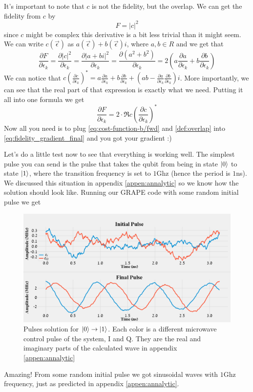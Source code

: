 It's important to note that $c$ is not the fidelity, but the overlap. We can get the fidelity from $c$ by
\[
F = |c|^2
\]
since $c$ might be complex this derivative is a bit less trivial than it might seem. We can write $c (\vec{\epsilon})$ as $a (\vec{\epsilon}) + b (\vec{\epsilon})i$, where $a, b \in R$ and we get that 
\[
\frac{\partial F}{\partial \epsilon_k} = \frac{\partial |c|^2}{\partial \epsilon_k} = \frac{\partial |a+bi|^2}{\partial \epsilon_k} = \frac{\partial (a^2 + b^2)}{\partial \epsilon_k} = 2 (a\frac{\partial a}{\partial \epsilon_k} + b\frac{\partial b}{\partial \epsilon_k})
\]
We can notice that $c (\frac{\partial c}{\partial \epsilon_k})^* = a\frac{\partial a}{\partial \epsilon_k} + b\frac{\partial b}{\partial \epsilon_k} + (ab - \frac{\partial a}{\partial \epsilon_k}\frac{\partial b}{\partial \epsilon_k})i$. More importantly, we can see that the real part of that expression is exactly what we need. Putting it all into one formula we get
\begin{equation} \label{eq:fidelity_gradient_final}
    \frac{\partial F}{\partial \epsilon_k} = 2\cdot \Re{c (\frac{\partial c}{\partial \epsilon_k})^*}
\end{equation}
Now all you need is to plug \ref{eq:cost-function-b/fwd} and \ref{def:overlap} into \ref{eq:fidelity_gradient_final} and you got your gradient :)

Let's do a little test now to see that everything is working well. The simplest pulse you can send is the pulse that takes the qubit from being in state $\ket{0}$ to state $\ket{1}$, where the transition frequency is set to $1$Ghz (hence the period is $1$ns). We discussed this situation in appendix \ref{appen:annalytic} so we know how the solution should look like. Running our GRAPE code with some random initial pulse we get
\begin{figure}[H]
    \centering
    \includegraphics[width=0.8\columnwidth]{Results/No-Constraints-single-qubit/pulses-prettier.png}
    \caption{Pulses solution for $\ket{0} \rightarrow \ket{1}$. Each color is a different microwave control pulse of the system, I and Q. They are the real and imaginary parts of the calculated wave in appendix \ref{appen:annalytic} }
    \label{fig:GRAPE-first-example}
\end{figure}
Amazing! From some random initial pulse we got sinusoidal waves with $1$Ghz frequency, just as predicted in appendix \ref{appen:annalytic}.


